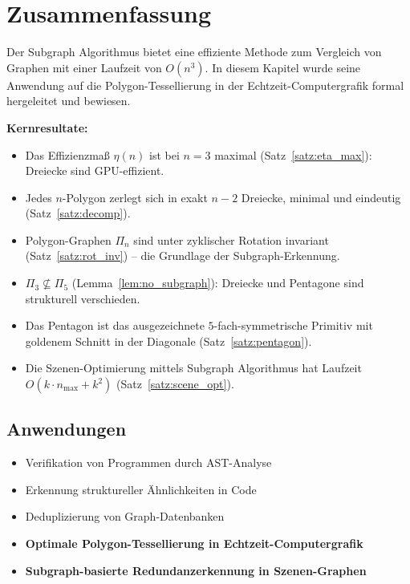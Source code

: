 ﻿\documentclass[a4paper,12pt]{article}
\theoremstyle{definition}
\begin{document}
\section{Zusammenfassung}

Der Subgraph Algorithmus bietet eine effiziente Methode zum Vergleich von
Graphen mit einer Laufzeit von $O(n^3)$. In diesem Kapitel wurde seine
Anwendung auf die Polygon-Tessellierung in der Echtzeit-Computergrafik
formal hergeleitet und bewiesen.

\textbf{Kernresultate:}
\begin{itemize}
	\item Das Effizienzma\ss{} $\eta(n)$ ist bei $n = 3$ maximal
	      (Satz~\ref{satz:eta_max}): Dreiecke sind GPU-effizient.
	\item Jedes $n$-Polygon zerlegt sich in exakt $n - 2$ Dreiecke,
	      minimal und eindeutig (Satz~\ref{satz:decomp}).
	\item Polygon-Graphen $\Pi_n$ sind unter zyklischer Rotation invariant
	      (Satz~\ref{satz:rot_inv}) -- die Grundlage der Subgraph-Erkennung.
	\item $\Pi_3 \not\subseteq \Pi_5$ (Lemma~\ref{lem:no_subgraph}):
	      Dreiecke und Pentagone sind strukturell verschieden.
	\item Das Pentagon ist das ausgezeichnete $5$-fach-symmetrische Primitiv
	      mit goldenem Schnitt in der Diagonale (Satz~\ref{satz:pentagon}).
	\item Die Szenen-Optimierung mittels Subgraph Algorithmus hat
	      Laufzeit $O(k \cdot n_{\max} + k^2)$ (Satz~\ref{satz:scene_opt}).
\end{itemize}

\subsection{Anwendungen}

\begin{itemize}
	\item Verifikation von Programmen durch AST-Analyse
	\item Erkennung struktureller \"Ahnlichkeiten in Code
	\item Deduplizierung von Graph-Datenbanken
	\item \textbf{Optimale Polygon-Tessellierung in Echtzeit-Computergrafik}
	\item \textbf{Subgraph-basierte Redundanzerkennung in Szenen-Graphen}
\end{itemize}
\end{document}
